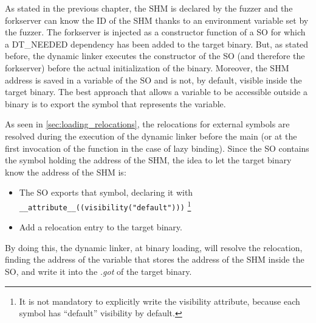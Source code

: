 As stated in the previous chapter, the \gls{SHM} is declared by the fuzzer and the forkserver can 
know the ID of the \gls{SHM} thanks to an environment variable set by the fuzzer.
The forkserver is injected as a constructor function of a \gls{SO} for which a DT\_NEEDED dependency 
has been added to the target binary.
But, as stated before, the dynamic linker executes the constructor of the \gls{SO} (and therefore the forkserver) before 
the actual initialization of the binary.
Moreover, the \gls{SHM} address is saved in a variable of the \gls{SO} and is not, by default, visible inside the target binary.
The best approach that allows a variable to be accessible outside a binary is to export the symbol 
that represents the variable.

As seen in \cref{sec:loading_relocations}, the relocations for external symbols are resolved during the 
execution of the dynamic linker before the main (or at the first invocation of the function in the case of lazy binding).
Since the \gls{SO} contains the symbol holding the address of the \gls{SHM}, the idea to let the target binary 
know the address of the \gls{SHM} is:
\begin{itemize}
    \item The \gls{SO} exports that symbol, declaring it with\\\texttt{\_\_attribute\_\_((visibility("default")))} \footnote{
        It is not mandatory to explicitly write the visibility attribute, because each symbol has ``default'' visibility by default.
    }
    \item Add a relocation entry to the target binary. 
\end{itemize}
By doing this, the dynamic linker, at binary loading, will resolve the relocation, finding the address of the variable 
that stores the address of the \gls{SHM} inside the \gls{SO}, and write it into the \textit{.got} of the target binary.

